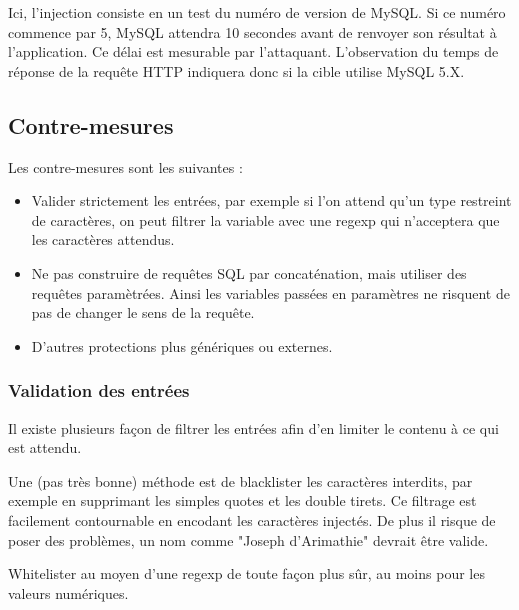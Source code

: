 Ici, l'injection consiste en un test du numéro de version de MySQL. Si ce numéro commence par 5, MySQL attendra 10 secondes avant de renvoyer son résultat à l'application. Ce délai est mesurable par l'attaquant. L'observation du temps de réponse de la requête HTTP indiquera donc si la cible utilise MySQL 5.X.

\subsection{Contre-mesures}\label{vulnerabilites:web:sqli:countermeasures}

Les contre-mesures sont les suivantes :
\begin{tabbing}
\end{tabbing}
\begin{itemize}
\item Valider strictement les entrées, par exemple si l'on attend qu'un type restreint de caractères, on peut filtrer la variable avec une regexp qui n'acceptera que les caractères attendus.
\item Ne pas construire de requêtes SQL par concaténation, mais utiliser des requêtes paramètrées. Ainsi les variables passées en paramètres ne risquent de pas de changer le sens de la requête.
\item D'autres protections plus génériques ou externes.
\end{itemize}

\subsubsection{Validation des entrées}\label{vulnerabilites:web:sqli:countermeasures:validation}

Il existe plusieurs façon de filtrer les entrées afin d'en limiter le contenu à ce qui est attendu.
\begin{tabbing}
\end{tabbing}

Une (pas très bonne) méthode est de blacklister les caractères interdits, par exemple en supprimant les simples quotes et les double tirets. Ce filtrage est facilement contournable en encodant les caractères injectés. De plus il risque de poser des problèmes, un nom comme "Joseph d'Arimathie" devrait être valide.
\begin{tabbing}
\end{tabbing}

Whitelister au moyen d'une regexp de toute façon plus sûr, au moins pour les valeurs numériques.

